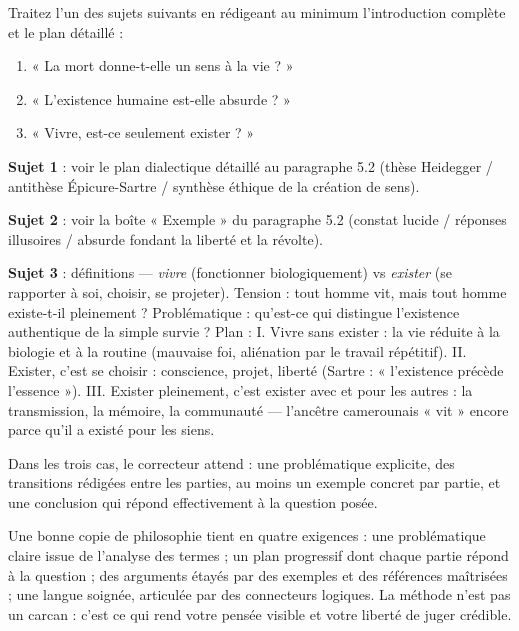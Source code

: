 \documentclass[11pt]{article}
\begin{document}
\begin{exercice}
Traitez l'un des sujets suivants en rédigeant au minimum l'introduction complète et le plan détaillé :
\begin{enumerate}
\item « La mort donne-t-elle un sens à la vie ? »
\item « L'existence humaine est-elle absurde ? »
\item « Vivre, est-ce seulement exister ? »
\end{enumerate}
\end{exercice}

\begin{corrige}
\textbf{Sujet 1} : voir le plan dialectique détaillé au paragraphe 5.2 (thèse Heidegger / antithèse Épicure-Sartre / synthèse éthique de la création de sens).

\textbf{Sujet 2} : voir la boîte « Exemple » du paragraphe 5.2 (constat lucide / réponses illusoires / absurde fondant la liberté et la révolte).

\textbf{Sujet 3} : définitions — \emph{vivre} (fonctionner biologiquement) vs \emph{exister} (se rapporter à soi, choisir, se projeter). Tension : tout homme vit, mais tout homme existe-t-il pleinement ? Problématique : qu'est-ce qui distingue l'existence authentique de la simple survie ? Plan : I. Vivre sans exister : la vie réduite à la biologie et à la routine (mauvaise foi, aliénation par le travail répétitif). II. Exister, c'est se choisir : conscience, projet, liberté (Sartre : « l'existence précède l'essence »). III. Exister pleinement, c'est exister avec et pour les autres : la transmission, la mémoire, la communauté — l'ancêtre camerounais « vit » encore parce qu'il a existé pour les siens.

Dans les trois cas, le correcteur attend : une problématique explicite, des transitions rédigées entre les parties, au moins un exemple concret par partie, et une conclusion qui répond effectivement à la question posée.
\end{corrige}

\begin{aretenir}
Une bonne copie de philosophie tient en quatre exigences : une problématique claire issue de l'analyse des termes ; un plan progressif dont chaque partie répond à la question ; des arguments étayés par des exemples et des références maîtrisées ; une langue soignée, articulée par des connecteurs logiques. La méthode n'est pas un carcan : c'est ce qui rend votre pensée visible et votre liberté de juger crédible.
\end{aretenir}
\end{document}
